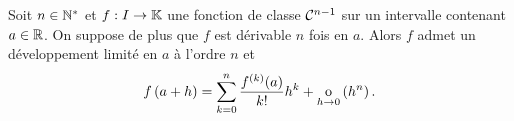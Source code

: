 \documentclass{magnolia}
\begin{document}
\begin{proposition}[utile=-3, nom=Formule de \nom{Taylor-Young}]
Soit $n\in{\mathbb{N}^*}$ et $f:I\to\mathbb{K}$ une fonction de classe $\mathcal{C}^{n-1}$ sur un intervalle contenant $a\in\mathbb{R}$. On suppose de plus que $f$ est
dérivable $n$ fois en $a$. Alors $f$ admet un développement limité en $a$ à
l'ordre $n$ et
\[f\left(a+h\right)=\sum_{k=0}^n \frac{f^{(k)}(a)}{k!}h^k+\underset{h \rightarrow 0}{\text{o}}\left(h^n\right).\]
\end{proposition}








\end{document}
